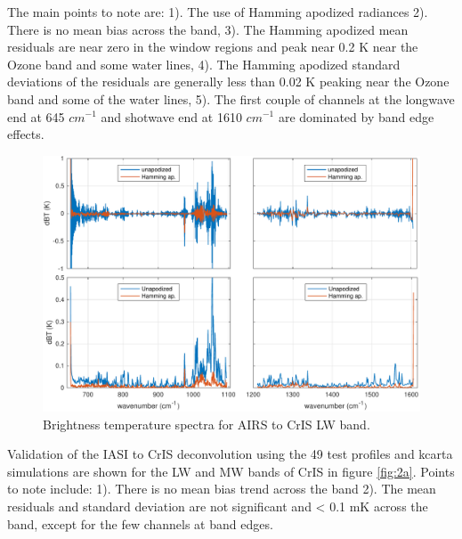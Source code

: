 \documentclass[twocolumn,10pt]{article}
\begin{document}
The main points to note are: 1). The use of Hamming apodized radiances 2). There is no mean bias across the band, 3). The Hamming apodized mean residuals are near zero in the window regions and peak near 0.2 K near the Ozone band and some water lines, 4). The Hamming apodized standard deviations of the residuals are generally less than 0.02 K peaking near the Ozone band and some of the water lines, 5). The first couple of channels at the longwave end at 645 $cm^{-1}$ and shotwave end at 1610 $cm^{-1}$ are dominated by band edge effects.

\begin{figure}[htb]
\centering
\includegraphics[width=\linewidth]{./figs/airs2cris_validation_LW_MW.pdf}
\caption{\label{fig:orgparagraph1}
  Brightness temperature spectra for AIRS to CrIS LW band.}
\label{fig:1a}
\end{figure}


Validation of the IASI to CrIS deconvolution using the 49 test profiles and kcarta simulations are shown for the LW and MW bands of CrIS in figure \ref{fig:2a}. Points to note include: 1). There is no mean bias trend across the band 2). The mean residuals and standard deviation are not significant and < 0.1 mK across the band, except for the few channels at band edges.
\end{document}
